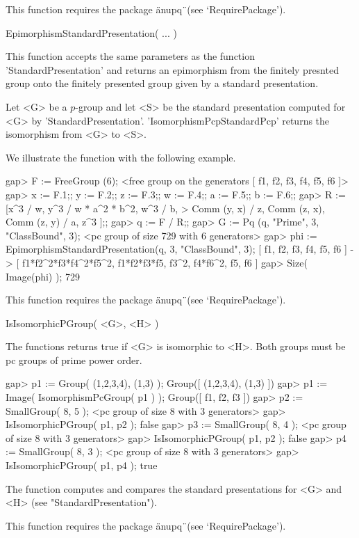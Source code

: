 This function requires the package \"anupq\"\ (see `RequirePackage').

\>EpimorphismStandardPresentation( ... )

This function accepts the same parameters as the function
'StandardPresentation' and returns an epimorphism from the finitely
presnted group onto the finitely presented group given by a standard
presentation. 


Let  <G> be  a  $p$-group and  let <S>  be  the  standard presentation
computed for <G> by 'StandardPresentation'. 'IsomorphismPcpStandardPcp'
returns the isomorphism from <G> to <S>.

We illustrate the function with the following example.

\beginexample
    gap> F := FreeGroup (6);                                                
    <free group on the generators [ f1, f2, f3, f4, f5, f6 ]>
    gap> x := F.1;; y := F.2;; z := F.3;; w := F.4;; a := F.5;; b := F.6;;
    gap> R := [x^3 / w, y^3 / w * a^2 * b^2, w^3 / b,
    >              Comm (y, x) / z, Comm (z, x), Comm (z, y) / a, z^3 ];;
    gap> q := F / R;;
    gap> G := Pq (q, "Prime", 3, "ClassBound", 3);
    <pc group of size 729 with 6 generators>
    gap> phi := EpimorphismStandardPresentation(q, 3, "ClassBound", 3);
    [ f1, f2, f3, f4, f5, f6 ] -> [ f1*f2^2*f3*f4^2*f5^2, f1*f2*f3*f5,
    f3^2, f4*f6^2, f5, f6 ]
    gap> Size( Image(phi) );
    729
\endexample

This function requires the package \"anupq\"\ (see `RequirePackage').


\>IsIsomorphicPGroup( <G>, <H> )

The functions returns true if <G> is isomorphic to <H>.  Both groups must
be pc groups of prime power order.

\beginexample
    gap> p1 := Group( (1,2,3,4), (1,3) );        
    Group([ (1,2,3,4), (1,3) ])
    gap> p1 := Image( IsomorphismPcGroup( p1 ) );
    Group([ f1, f2, f3 ])
    gap> p2 := SmallGroup( 8, 5 );
    <pc group of size 8 with 3 generators>
    gap> IsIsomorphicPGroup( p1, p2 );
    false
    gap> p3 := SmallGroup( 8, 4 );
    <pc group of size 8 with 3 generators>
    gap> IsIsomorphicPGroup( p1, p2 );
    false
    gap> p4 := SmallGroup( 8, 3 );   
    <pc group of size 8 with 3 generators>
    gap> IsIsomorphicPGroup( p1, p4 );
    true
\endexample

The function computes and compares the standard presentations for <G> and
<H> (see "StandardPresentation").

This function requires the package \"anupq\"\ (see `RequirePackage').

